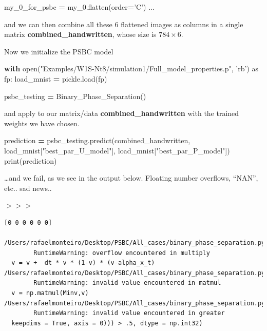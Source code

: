 \documentclass[openany,twoside]{book}
\newenvironment{Shaded}{\begin{snugshade}}{\end{snugshade}}
\newcommand{\BuiltInTok}[1]{#1}
\newcommand{\ControlFlowTok}[1]{\textcolor[rgb]{0.13,0.29,0.53}{\textbf{#1}}}
\newcommand{\ImportTok}[1]{#1}
\newcommand{\NormalTok}[1]{#1}
\newcommand{\OperatorTok}[1]{\textcolor[rgb]{0.81,0.36,0.00}{\textbf{#1}}}
\newcommand{\StringTok}[1]{\textcolor[rgb]{0.31,0.60,0.02}{#1}}
\begin{document}
\begin{Shaded}
\begin{Highlighting}[]
\NormalTok{my_0_for_psbc }\OperatorTok{=}\NormalTok{ my_0.flatten(order}\OperatorTok{=}\StringTok{'C'}\NormalTok{)}
\NormalTok{...}
\end{Highlighting}
\end{Shaded}

and we can then combine all these 6 flattened images as columns in a single matrix \textbf{combined\_handwritten}, whose size is \(784\times 6\).

Now we initialize the PSBC model

\begin{Shaded}
\begin{Highlighting}[]
\ControlFlowTok{with} \BuiltInTok{open}\NormalTok{(}\StringTok{"Examples/W1S-Nt8/simulation1/Full_model_properties.p"}\NormalTok{, }\StringTok{'rb'}\NormalTok{) }\ImportTok{as}\NormalTok{ fp:}
\NormalTok{	load_mnist }\OperatorTok{=}\NormalTok{ pickle.load(fp)}

\NormalTok{psbc_testing }\OperatorTok{=}\NormalTok{ Binary_Phase_Separation()}
\end{Highlighting}
\end{Shaded}

and apply to our matrix/data \textbf{combined\_handwritten} with the trained weights we have chosen.

\begin{Shaded}
\begin{Highlighting}[]
\NormalTok{prediction }\OperatorTok{=}\NormalTok{ psbc_testing.predict(combined_handwritten, load_mnist[}\StringTok{"best_par_U_model"}\NormalTok{],}
\NormalTok{	load_mnist[}\StringTok{"best_par_P_model"}\NormalTok{])}
\BuiltInTok{print}\NormalTok{(prediction)}
\end{Highlighting}
\end{Shaded}

\ldots and we fail, as we see in the output below. Floating number overflows, ``NAN'', etc.. sad news..

\(>>>\)

\begin{verbatim}
[0 0 0 0 0 0]

/Users/rafaelmonteiro/Desktop/PSBC/All_cases/binary_phase_separation.py:475: 
		RuntimeWarning: overflow encountered in multiply
  v = v +  dt * v * (1-v) * (v-alpha_x_t)
/Users/rafaelmonteiro/Desktop/PSBC/All_cases/binary_phase_separation.py:477: 
		RuntimeWarning: invalid value encountered in matmul
  v = np.matmul(Minv,v)
/Users/rafaelmonteiro/Desktop/PSBC/All_cases/binary_phase_separation.py:1128: 
		RuntimeWarning: invalid value encountered in greater
  keepdims = True, axis = 0))) > .5, dtype = np.int32)
\end{verbatim}
\end{document}
